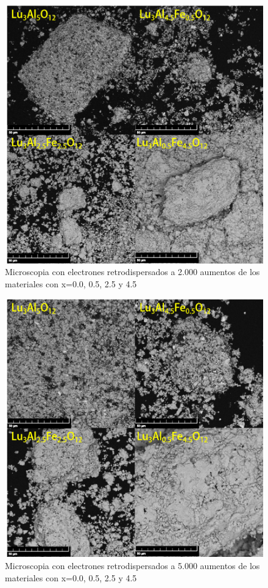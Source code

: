 \begin{appendix}
	\begin{figure}[h]
		\centering%

		\includegraphics[width=\textwidth]{Kap5/ret2k.png}%
		\caption{Microscopia con electrones retrodispersados a 2.000 aumentos de los
		materiales  con x=0.0, 0.5, 2.5 y
		4.5}\label{fig:ret2}
	\end{figure}

	\begin{figure}[h]
		\centering%

		\includegraphics[width=\textwidth]{Kap5/ret5k.png}%
		\caption{Microscopia con electrones retrodispersados a 5.000 aumentos de los
		materiales  con x=0.0, 0.5, 2.5 y
		4.5}\label{fig:ret5}
	\end{figure}


\end{appendix}
